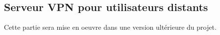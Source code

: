 \subsection{Serveur VPN pour utilisateurs distants}

\begin{tip}
    \textcolor{Chartreuse4}{Cette partie sera mise en oeuvre dans une version ultérieure du projet.}
\end{tip}